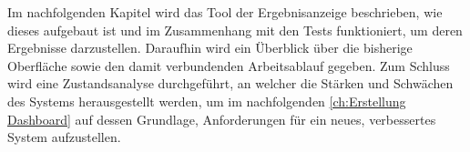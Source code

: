 





Im nachfolgenden Kapitel wird das Tool der Ergebnisanzeige beschrieben, wie dieses aufgebaut ist und im Zusammenhang mit den Tests funktioniert, um deren Ergebnisse darzustellen. Daraufhin wird ein Überblick über die bisherige Oberfläche sowie den damit verbundenden Arbeitsablauf gegeben. Zum Schluss wird eine Zustandsanalyse durchgeführt, an welcher die Stärken und Schwächen des Systems herausgestellt werden, um im nachfolgenden \autoref{ch:Erstellung Dashboard} auf dessen Grundlage, Anforderungen für ein neues, verbessertes System aufzustellen.





